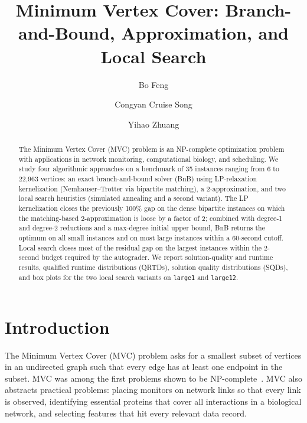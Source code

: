 \documentclass[sigconf]{acmart}
\begin{document}
\title{Minimum Vertex Cover: Branch-and-Bound, Approximation, and Local Search}

\author{Bo Feng}

\author{Congyan Cruise Song}

\author{Yihao Zhuang}

\begin{abstract}
  The Minimum Vertex Cover (MVC) problem is an NP-complete
  optimization problem with applications in network monitoring,
  computational biology, and scheduling. We study four algorithmic
  approaches on a benchmark of 35 instances ranging from 6 to
  22{,}963 vertices: an exact branch-and-bound solver (BnB) using
  LP-relaxation kernelization
  (Nemhauser--Trotter via bipartite matching), a 2-approximation, and
  two local search heuristics (simulated annealing and a second
  variant). The LP kernelization closes the previously 100\% gap on
  the dense bipartite instances on which the matching-based
  2-approximation is loose by a factor of 2; combined with degree-1
  and degree-2 reductions and a max-degree initial upper bound, BnB
  returns the optimum on all small instances and on most large
  instances within a 60-second cutoff. Local search closes most of
  the residual gap on the largest instances within the 2-second
  budget required by the autograder. We report solution-quality and
  runtime results, qualified runtime distributions (QRTDs), solution
  quality distributions (SQDs), and box plots for the two local
  search variants on \texttt{large1} and \texttt{large12}.
\end{abstract}

\maketitle

\section{Introduction}
The Minimum Vertex Cover (MVC) problem asks for a smallest subset of
vertices in an undirected graph such that every edge has at least one
endpoint in the subset. MVC was among the first problems shown to be
NP-complete~\cite{karp1972reducibility}. MVC also abstracts practical
problems: placing monitors on network links so that every link is
observed, identifying essential proteins that cover all interactions
in a biological network, and selecting features that hit every
relevant data record.
\end{document}

